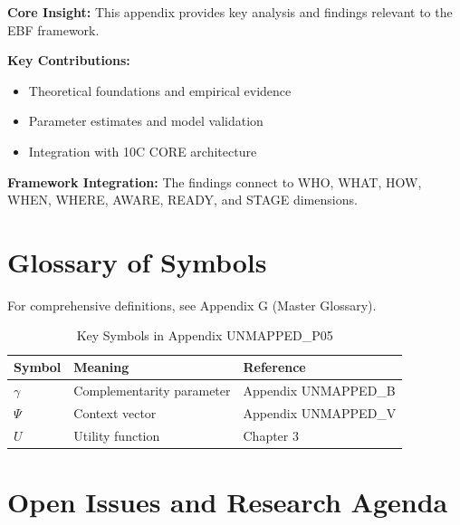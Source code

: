\begin{tcolorbox}[colback=gray!5!white, colframe=gray!75!black,
    title=Appendix UNMAPPED_P05 Summary]

\textbf{Core Insight:}
This appendix provides key analysis and findings relevant to the EBF framework.

\textbf{Key Contributions:}
\begin{itemize}[nosep]
    \item Theoretical foundations and empirical evidence
    \item Parameter estimates and model validation
    \item Integration with 10C CORE architecture
\end{itemize}

\textbf{Framework Integration:}
The findings connect to WHO, WHAT, HOW, WHEN, WHERE, AWARE, READY, and STAGE dimensions.

\end{tcolorbox}

\section{Glossary of Symbols}
\label{sec:p05-glossary}

For comprehensive definitions, see Appendix G (Master Glossary).

\begin{table}[htbp]
\centering
\caption{Key Symbols in Appendix UNMAPPED_P05}
\begin{tabular}{lll}
\toprule
\textbf{Symbol} & \textbf{Meaning} & \textbf{Reference} \\
\midrule
$\gamma$ & Complementarity parameter & Appendix UNMAPPED_B \\
$\Psi$ & Context vector & Appendix UNMAPPED_V \\
$U$ & Utility function & Chapter 3 \\
\bottomrule
\end{tabular}
\end{table}



\section{Open Issues and Research Agenda}
\label{sec:p05-open}

